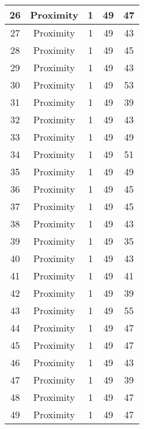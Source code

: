 \documentclass[results.tex]{subfiles}
\begin{document}
\begin{center}
\begin{tabular}{| c || c | c | c | c |}
    \hline
    26 & Proximity & 1 & 49 & 47 \\ 
    \hline
    27 & Proximity & 1 & 49 & 43 \\ 
    \hline
    28 & Proximity & 1 & 49 & 45 \\ 
    \hline
    29 & Proximity & 1 & 49 & 43 \\ 
    \hline
    30 & Proximity & 1 & 49 & 53 \\ 
    \hline
    31 & Proximity & 1 & 49 & 39 \\ 
    \hline
    32 & Proximity & 1 & 49 & 43 \\ 
    \hline
    33 & Proximity & 1 & 49 & 49 \\ 
    \hline
    34 & Proximity & 1 & 49 & 51 \\ 
    \hline
    35 & Proximity & 1 & 49 & 49 \\ 
    \hline
    36 & Proximity & 1 & 49 & 45 \\ 
    \hline
    37 & Proximity & 1 & 49 & 45 \\ 
    \hline
    38 & Proximity & 1 & 49 & 43 \\ 
    \hline
    39 & Proximity & 1 & 49 & 35 \\ 
    \hline
    40 & Proximity & 1 & 49 & 43 \\ 
    \hline
    41 & Proximity & 1 & 49 & 41 \\ 
    \hline
    42 & Proximity & 1 & 49 & 39 \\ 
    \hline
    43 & Proximity & 1 & 49 & 55 \\ 
    \hline
    44 & Proximity & 1 & 49 & 47 \\ 
    \hline
    45 & Proximity & 1 & 49 & 47 \\ 
    \hline
    46 & Proximity & 1 & 49 & 43 \\ 
    \hline
    47 & Proximity & 1 & 49 & 39 \\ 
    \hline
    48 & Proximity & 1 & 49 & 47 \\ 
    \hline
    49 & Proximity & 1 & 49 & 47 \\ 
    \hline   \end{tabular}
\end{center}
\end{document}
